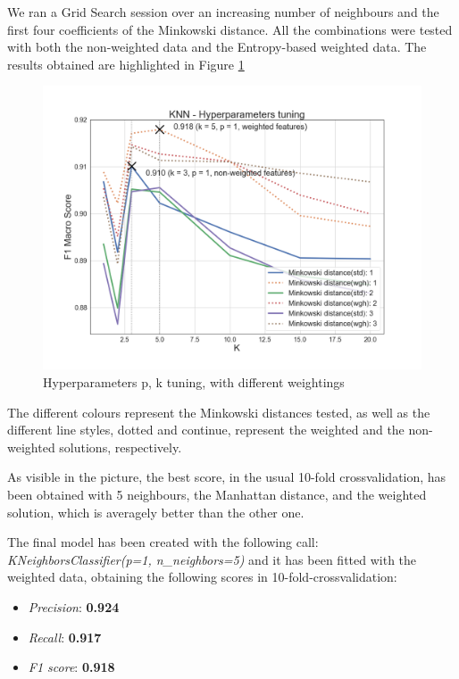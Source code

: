 We ran a Grid Search session over an increasing number of neighbours and the first four coefficients of the Minkowski distance.
All the combinations were tested with both the non-weighted data and the Entropy-based weighted data.
The results obtained are highlighted in Figure \ref{fig:knn_tuning}

\begin{figure}
	\includegraphics[width=\columnwidth]{chapter5/figure/knn_tuning.png}
	\caption{Hyperparameters p, k tuning, with different weightings}
	\label{fig:knn_tuning}
\end{figure}
The different colours represent the Minkowski distances tested, as well as the different line styles, dotted and continue, represent the weighted and the non-weighted solutions, respectively.

As visible in the picture, the best score, in the usual 10-fold crossvalidation, has been obtained with 5 neighbours, the Manhattan distance, and the weighted solution, which is averagely better than the other one.

The final model has been created with the following call: \textit{KNeighborsClassifier(p=1, n\_neighbors=5)} and it has been fitted with the weighted data, obtaining the following scores in 10-fold-crossvalidation:

\begin{itemize}
	\item[\PencilRight] \textit{Precision}: \textbf{0.924}
	\item[\PencilRight] \textit{Recall}: \textbf{0.917}
	\item[\PencilRight] \textit{F1 score}: \textbf{0.918}
\end{itemize}


